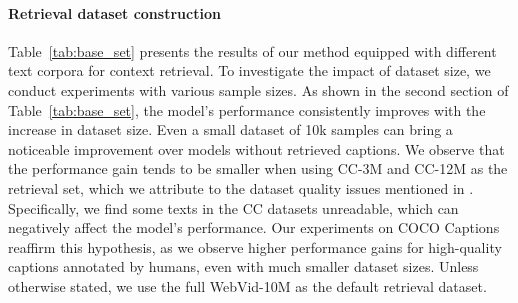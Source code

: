 \begin{table}[h]
    \centering
     \vspace{-2mm}
    \caption{{\bf Retrieval vs. random sample.} {\tt Subtitles:} is used as prompt and 10 sentences are used per video in all experiments.}
    \label{tab:retrieve_vs_random}
    \vspace{-4mm}
\end{table}


 

\paragraph{Retrieval dataset construction} Table~\ref{tab:base_set} presents the results of our method equipped with different text corpora for context retrieval. To investigate the impact of dataset size, we conduct experiments with various sample sizes. As shown in the second section of Table~\ref{tab:base_set}, the model's performance consistently improves with the increase in dataset size. Even a small dataset of 10k samples can bring a noticeable improvement over models without retrieved captions. We observe that the performance gain tends to be smaller when using CC-3M and CC-12M as the retrieval set, which we attribute to the dataset quality issues mentioned in \cite{mapl}. Specifically, we find some texts in the CC datasets unreadable, which can negatively affect the model's performance. Our experiments on COCO Captions reaffirm this hypothesis, as we observe higher performance gains for high-quality captions annotated by humans, even with much smaller dataset sizes. Unless otherwise stated, we use the full WebVid-10M as the default retrieval dataset.


